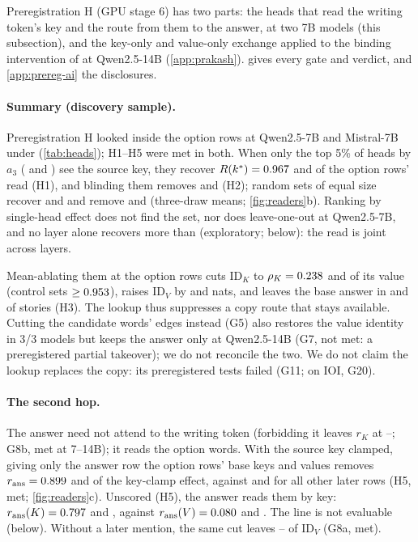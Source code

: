 Preregistration H (GPU stage 6) has two parts: the heads that read the writing token's key and the route from them to the answer, at two 7B models (this subsection), and the key-only and value-only exchange applied to the binding intervention of \citet{prakash2025lookbacks} at Qwen2.5-14B (\cref{app:prakash}).  gives every gate and verdict, and \cref{app:prereg-ai} the disclosures.

\paragraph{Summary (discovery sample).} Preregistration H looked inside the option rows at Qwen2.5-7B and Mistral-7B under \fmtOpt{} (\cref{tab:heads}); H1--H5 were met in both. When only the top 5\% of heads by $a_3$ (\HkstarQwenSeven{} and \HkstarMistralSeven{}) see the source key, they recover $R(k^*) = 0.967{}$ and \HoneRMistralSeven{} of the option rows' read (H1), and blinding them removes \HtwoKOQwenSeven{} and \HtwoKOMistralSeven{} (H2); random sets of equal size recover \HtwoRrandQwenSeven{} and \HtwoRrandMistralSeven{} and remove \HtwoKOrandQwenSeven{} and \HtwoKOrandMistralSeven{} (three-draw means; \cref{fig:readers}b). Ranking by single-head effect does not find the set, nor does leave-one-out at Qwen2.5-7B, and no layer alone recovers more than \HlayerMaxOptQwenSeven{} (exploratory; below): the read is joint across layers.

Mean-ablating them at the option rows cuts $\mathrm{ID}_K$ to $\rho_K = 0.238{}$ and \HthreeRhoMistralSeven{} of its value (control sets $\geq 0.953{}$), raises $\mathrm{ID}_V$ by \HthreeDVQwenSeven{} and \HthreeDVMistralSeven{} nats, and leaves the base answer in \HthreeBaseQwenSeven{} and \HthreeBaseMistralSeven{} of stories (H3). The lookup thus suppresses a copy route that stays available. Cutting the candidate words' edges instead (G5) also restores the value identity in 3/3 models but keeps the answer only at Qwen2.5-14B (G7, not met: a preregistered partial takeover); we do not reconcile the two. We do not claim the lookup replaces the copy: its preregistered tests failed (G11; on IOI, G20).

\paragraph{The second hop.} The answer need not attend to the writing token (forbidding it leaves $r_K$ at \GeightbRKMistralSeven{}--\GeightbRKQwenSeven{}; G8b, met at 7--14B); it reads the option words. With the source key clamped, giving only the answer row the option rows' base keys and values removes $r_{\mathrm{ans}} = 0.899{}$ and \HfiveAnsMistralSeven{} of the key-clamp effect, against \HfiveOtherQwenSeven{} and \HfiveOtherMistralSeven{} for all other later rows (H5, met; \cref{fig:readers}c). Unscored (H5), the answer reads them by key: $r_{\mathrm{ans}}(K) = 0.797{}$ and \HfiveAnsKMistralSeven{}, against $r_{\mathrm{ans}}(V) = 0.080{}$ and \HfiveAnsVMistralSeven{}. The \fmtPost{} line is not evaluable (below). Without a later mention, the same cut leaves \GeightaRatioQwenSeven{}--\GeightaRatioMistralSeven{} of $\mathrm{ID}_V$ (G8a, met).

